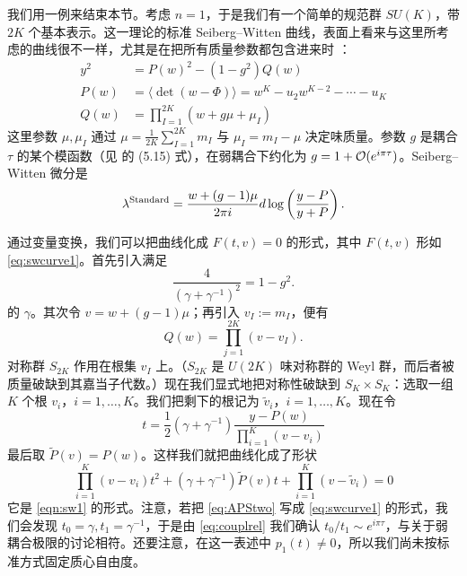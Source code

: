 我们用一例来结束本节。考虑 $n=1$，于是我们有一个简单的规范群 $SU(K)$，带 $2K$ 个基本表示。这一理论的标准 Seiberg–Witten 曲线，表面上看来与这里所考虑的曲线很不一样，尤其是在把所有质量参数都包含进来时 \cite{Argyres:1995wt}：
\begin{align}
y^2 & = P(w)^2 - (1-g^2) Q(w) \label{eq:example-sw-1}\\
P(w) & = \langle \det(w-\Phi)\rangle  = w^K - u_2 w^{K-2} -\cdots
- u_K \label{eq:example-sw-2}\\
Q(w) & =\prod_{I=1}^{2K} (w + g \mu + \mu_I) \label{eq:example-sw-3}
\end{align}
这里参数 $\mu, \mu_I$ 通过 $\mu = \frac{1}{2K} \sum_{I=1}^{2K} m_I $ 与 $\mu_I = m_I - \mu$ 决定味质量。参数 $g$ 是耦合 $\tau$ 的某个模函数（见 \cite{Argyres:1995wt} 的 (5.15) 式），在弱耦合下约化为 $g= 1 + \mathcal{O}(e^{i \pi \tau})$。Seiberg–Witten 微分是
\begin{equation}
\label{eq:SWstandard}
\lambda^{\rm Standard} = \frac{w + (g-1) \mu}{2\pi i} d \log \left(
\frac{y-P}{y+P} \right).
\end{equation}

通过变量变换，我们可以把曲线化成 $F(t,v)=0$ 的形式，其中 $F(t,v)$ 形如 \eqref{eq:swcurve1}。首先引入满足
\begin{equation}\label{eq:couplrel}
\frac{4}{(\gamma + \gamma^{-1})^2} = 1-g^2.
\end{equation}
的 $\gamma$。其次令 $v= w  + (g-1) \mu$；再引入 $v_I := m_I$，便有
\begin{equation}
\label{eq:Qw-as-v}
Q(w) = \prod_{j=1}^{2K} (v-v_I).
\end{equation}
对称群 $S_{2K}$ 作用在根集 $v_I$ 上。（$S_{2K}$ 是 $U(2K)$ 味对称群的 Weyl 群，而后者被质量破缺到其嘉当子代数。）现在我们显式地把对称性破缺到 $S_K \times S_K$：选取一组 $K$ 个根 $v_i$，$i=1,\dots, K$。我们把剩下的根记为 $\tilde v_i$，$i=1, \dots, K$。现在令
\begin{equation}
\label{eq:t-definition-example}
t=  \frac{1}{2}(\gamma + \gamma^{-1}) \frac{y-P(w)}{\prod_{i=1}^K( v-v_i)}
\end{equation}
最后取 $ \tilde P(v) = P(w)$。这样我们就把曲线化成了形状
\begin{equation}\label{eq:APStwo}
\prod_{i=1}^K (v-v_i) t^2 + (\gamma + \gamma^{-1}) \tilde P(v) t +
\prod_{i=1}^K (v-\tilde v_i) = 0
\end{equation}
它是 \eqref{eqn:sw1} 的形式。注意，若把 \eqref{eq:APStwo} 写成 \eqref{eq:swcurve1} 的形式，我们会发现 $t_0 = \gamma, t_1 = \gamma^{-1}$，于是由 \eqref{eq:couplrel} 我们确认 $t_0/t_1 \sim e^{i \pi \tau}$，与关于弱耦合极限的讨论相符。还要注意，在这一表述中 $p_1(t)\not=0$，所以我们尚未按标准方式固定质心自由度。

